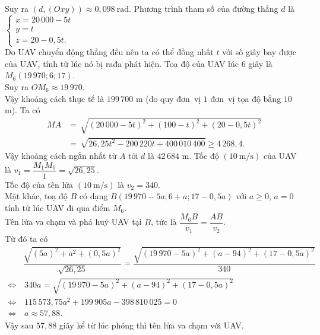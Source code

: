 \begin{ex}
{\begin{itemchoice}
			Suy ra $\left(d,(Oxy)\right) \approx  0{,}098 \mathrm{~rad}$.
			\itemch Phương trình tham số của đường thẳng $d$ là $\left\{\begin{array}{l}x=20\,000-5t \\ y=t \\ z=20-0{,}5 t.
		\end{array}\right.$\\
		Do UAV chuyển động thẳng đều nên ta có thể đồng nhất $t$ với số giây  bay được của UAV, tính từ lúc nó bị rađa phát hiện. Toạ độ của UAV lúc $6$ giây là $M_6(19\,970;6;17)$.\\
		Suy  ra $OM_6 \approx 19\,970$.\\
		Vậy khoảng cách thực tế là $199\,700$ m (do quy đơn~vị $1$  đơn~vị tọa độ bằng $10$ m).
		 \itemch Ta có
		\allowdisplaybreaks 
		\begin{align*}
			MA&=\,\sqrt{(20\,000-5 t)^2+(100-t)^2+(20-0{,}5 t)^2}\\ 
			&=\,\sqrt{26{,}25  t^2-200\,220 t+400\,010\,400} \geq 4\,268{,}4.
		\end{align*}
		Vậy khoảng cách ngắn nhất  từ $A$ tới $d$ là $42\,684$ m.
		\itemch Tốc độ $(10 \mathrm{~m}/\mathrm{s})$  của UAV là $v_1=\dfrac{M_1 M_0}{1}=\sqrt{26{,}25}$.\\
		Tốc độ của tên lửa $(10\mathrm{~m}/\mathrm{s})$  là $v_2=340$.\\
		Mặt khác, toạ độ $B$ có dạng $B(19\,970-5 a;6+a;17-0{,}5a)$ với $a\geq 0$, $a=0$ tính từ lúc UAV đi qua điểm $M_6$.\\ 
		Tên  lửa va chạm và phá huỷ UAV tại $B$, tức là $\dfrac{M_6B}{v_1}=\dfrac{AB}{v_2}$.\\
		Từ đó ta  có
		\allowdisplaybreaks 
		\begin{align*}
			&\dfrac{\sqrt{(5a)^2+a^2+(0{,}5  a)^2}}{\sqrt{26{,}25}}=\dfrac{\sqrt{(19\,970-5 a)^2+(a-94)^2+(17-0{,}5 a)^2}}{340} \\
			 \Leftrightarrow&\, 340a=\sqrt{(19\,970-5 a)^2+(a-94)^2+(17-0{,}5 a)^2} \\
			\Leftrightarrow&\, 115\,573{,}75 a^2+199\,905 a-398\,810\,025=0\\ \Leftrightarrow&\,  a \approx 57{,}88.
		\end{align*}
		Vậy sau $57{,}88$ giây kể từ lúc phóng thì tên lửa va chạm với UAV. 
	\end{itemchoice}
	} 
	\end{ex}

